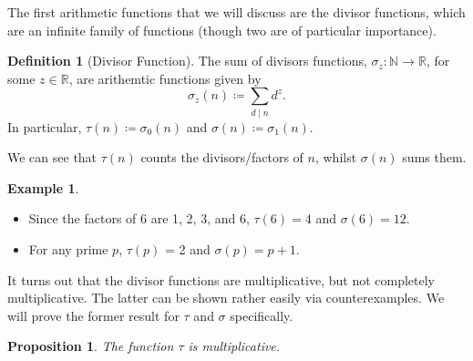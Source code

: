 \documentclass[a4paper]{article}
\newtheorem{proposition}[theorem]{Proposition}
\theoremstyle{definition}
\newtheorem{definition}{Definition}
\newtheorem*{example}{Example}
\begin{document}
The first arithmetic functions that we will discuss are the divisor functions, which are an infinite family of functions (though two are of particular importance).
\begin{definition}[Divisor Function]
    The sum of divisors functions, $\sigma_z: \mathbb{N} \to \mathbb{R}$, for some $z \in \mathbb{R}$, are arithemtic functions given by
    \begin{equation}
        \sigma_z(n) \coloneq \sum_{d \mid n} d^z.
    \end{equation}
    In particular, $\tau(n) \coloneq \sigma_0(n)$ and $\sigma(n) \coloneq \sigma_1(n)$.
\end{definition}
We can see that $\tau(n)$ counts the divisors/factors of $n$, whilst $\sigma(n)$ sums them.
\begin{example} \leavevmode
    \begin{itemize}
        \item Since the factors of 6 are 1, 2, 3, and 6, $\tau(6) = 4$ and $\sigma(6) = 12$.
        \item For any prime $p$, $\tau(p)$ = 2 and $\sigma(p) = p + 1$.
    \end{itemize}
\end{example}
It turns out that the divisor functions are multiplicative, but not completely multiplicative.
The latter can be shown rather easily via counterexamples.
We will prove the former result for $\tau$ and $\sigma$ specifically.
\begin{proposition} \label{thm:Prop 1}
    The function $\tau$ is multiplicative.
\end{proposition}
\end{document}
